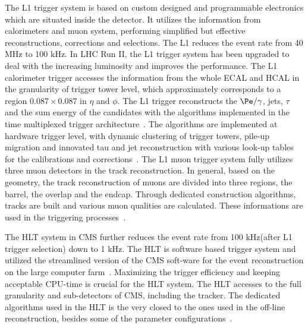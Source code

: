 The L1 trigger system is based on custom designed and programmable electronics which are situated inside the detector. It utilizes the information from calorimeters and muon system, performing simplified but effective reconstructions, corrections and selections. The L1 reduces the event rate from 40 MHz to 100 kHz. In LHC Run II, the L1 trigger system has been upgraded to deal with the increasing luminosity and improves the performance. The L1 calorimeter trigger accesses the information from the whole ECAL and HCAL in the granularity of trigger tower level, which approximately corresponds to a region $0.087\times0.087$ in $\eta$ and $\phi$. The L1 trigger reconstructs the $\Pe/\gamma$, jets, $\tau$ and the sum energy of the candidates with the algorithms implemented in the time multiplexed trigger architecture~\cite{TMT_trigger}. The algorithms are implemented at hardware trigger level, with dynamic clustering of trigger towers, pile-up migration and innovated tau and jet reconstruction with various look-up tables for the calibrations and corrections~\cite{L1_Egamma}. The L1 muon trigger system fully utilizes three muon detectors in the track reconstruction. In general, based on the geometry, the track reconstruction of muons are divided into three regions, the barrel, the overlap and the endcap. Through dedicated construction algorithms, tracks are built and various muon qualities are calculated. These informations are used in the triggering processes~\cite{L1muontrigger}. 


The HLT system in CMS further reduces the event rate from 100 kHz(after L1 trigger selection) down to 1 kHz. The HLT is software based trigger system and utilized the streamlined version of the CMS soft-ware for the event reconstruction on the large computer farm~\cite{CMS_trigger_RUNII}. Maximizing the trigger efficiency and keeping acceptable CPU-time is crucial for the HLT system. The HLT accesses to the full granularity and sub-detectors of CMS, including the tracker. The dedicated algorithms used in the HLT is the very closed to the ones used in the off-line reconstruction, besides some of the parameter configurations~\cite{CMS_HLT_RunII}.             












